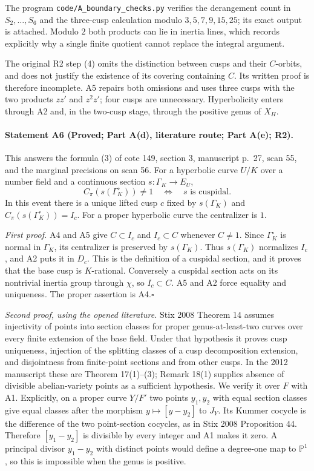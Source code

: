 The program \texttt{code/A\_boundary\_checks.py} verifies the derangement count in $S_2,\ldots,S_6$ and the three-cusp calculation modulo $3,5,7,9,15,25$; its exact output is attached. Modulo $2$ both products can lie in inertia lines, which records explicitly why a single finite quotient cannot replace the integral argument.

The original R2 step (4) omits the distinction between cusps and their $C$-orbits, and does not justify the existence of its covering containing $C$. Its written proof is therefore incomplete. A5 repairs both omissions and uses three cusps with the two products $zz'$ and $z^2z'$; four cusps are unnecessary. Hyperbolicity enters through A2 and, in the two-cusp stage, through the positive genus of $X_H$.

\paragraph{Statement A6 (Proved; Part A(d), literature route; Part A(e); R2).}\label{res:A6}
This answers the formula (3) of cote 149, section 3, manuscript p.~27, scan 55, and the marginal precisions on scan 56.
For a hyperbolic curve $U/K$ over a number field and a continuous section $s:\Gamma_K\to E_U$,
\[
 C_\pi(s(\Gamma_K^\circ))\ne1
 \quad\Longleftrightarrow\quad s\text{ is cuspidal}.
\]
In this event there is a unique lifted cusp $c$ fixed by $s(\Gamma_K)$ and
$C_\pi(s(\Gamma_K^\circ))=I_c$. For a proper hyperbolic curve the centralizer is $1$.

\emph{First proof.} A4 and A5 give $C\subset I_c$ and $I_c\subset C$ whenever $C\ne1$. Since $\Gamma_K^\circ$ is normal in $\Gamma_K$, its centralizer is preserved by $s(\Gamma_K)$. Thus $s(\Gamma_K)$ normalizes $I_c$, and A2 puts it in $D_c$. This is the definition of a cuspidal section, and it proves that the base cusp is $K$-rational. Conversely a cuspidal section acts on its nontrivial inertia group through $\chi$, so $I_c\subset C$. A5 and A2 force equality and uniqueness. The proper assertion is A4.\hfill$\square$

\emph{Second proof, using the opened literature.} Stix 2008 Theorem 14 assumes injectivity of points into section classes for proper genus-at-least-two curves over every finite extension of the base field. Under that hypothesis it proves cusp uniqueness, injection of the splitting classes of a cusp decomposition extension, and disjointness from finite-point sections and from other cusps. In the 2012 manuscript these are Theorem 17(1)--(3); Remark 18(1) supplies absence of divisible abelian-variety points as a sufficient hypothesis. We verify it over $F$ with A1. Explicitly, on a proper curve $Y/F'$ two points $y_1,y_2$ with equal section classes give equal classes after the morphism $y\mapsto[y-y_2]$ to $J_Y$. Its Kummer cocycle is the difference of the two point-section cocycles, as in Stix 2008 Proposition 44. Therefore $[y_1-y_2]$ is divisible by every integer and A1 makes it zero. A principal divisor $y_1-y_2$ with distinct points would define a degree-one map to $\mathbb P^1$, so this is impossible when the genus is positive.

